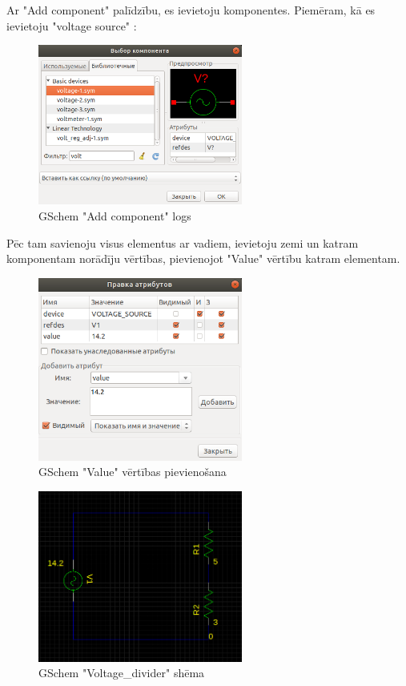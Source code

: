 \documentclass{article}
\begin{document}
        Ar "Add component" palīdzību, es ievietoju komponentes. Piemēram, kā es ievietoju "voltage source" :
        
        \begin{figure}[H]\centering\includegraphics[width=0.60\textwidth]{pictures/gschem2.PNG}\caption{GSchem "Add component" logs}\label{picture:10lw2p}\end{figure}
        \newpage
        
        Pēc tam savienoju visus elementus ar vadiem, ievietoju zemi un katram komponentam norādīju vērtības, pievienojot "Value" vērtību katram elementam.
        
        \begin{figure}[H]\centering\includegraphics[width=0.60\textwidth]{pictures/gschem4.PNG}\caption{GSchem "Value" vērtības pievienošana}\label{picture:10lw3p}\end{figure}
        
        \begin{figure}[H]\centering\includegraphics[width=0.60\textwidth]{pictures/gschem3.PNG}\caption{GSchem "Voltage\_divider" shēma}\label{picture:10lw4p}\end{figure}
    
\end{document}
